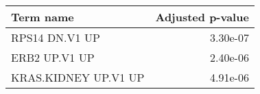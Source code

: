 \begin{tabular}{lr}
\toprule
           Term name &  Adjusted p-value \\
\midrule
      RPS14 DN.V1 UP &          3.30e-07 \\
       ERB2 UP.V1 UP &          2.40e-06 \\
KRAS.KIDNEY UP.V1 UP &          4.91e-06 \\
\bottomrule
\end{tabular}
